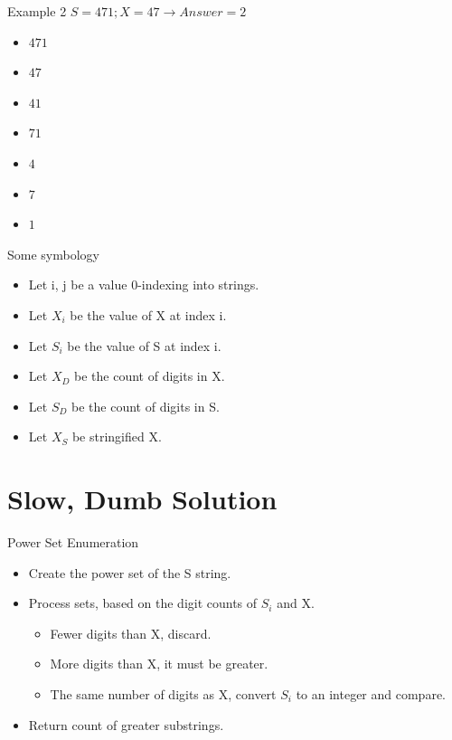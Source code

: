 \documentclass[10pt]{beamer}
\begin{document}
\begin{frame}{Example 2}
  \Large
  $S = 471; X = 47 \rightarrow Answer = 2$ \\
  \begin{itemize}[<+->]
    \item $471 $   
    \item $47  $    
    \item $41  $ 
    \item $71  $    
    \item $4   $ \only<8->{$\le 47$}
    \item $7   $ 
    \item $1   $ 
  \end{itemize}
\end{frame}

\begin{frame}{Some symbology}
  \Large
  \begin{itemize} %
    \item Let i, j be a value 0-indexing into strings.
    \item Let $X_{i}$ be the value of X at index i.
    \item Let $S_{i}$ be the value of S at index i.
    \item Let $X_{D}$ be the count of digits in X.
    \item Let $S_{D}$ be the count of digits in S.
    \item Let $X_{S}$ be stringified X.
  \end{itemize}
\end{frame}

\section{Slow, Dumb Solution}

\begin{frame}{Power Set Enumeration}
  \Large
  \begin{itemize} %
    \item Create the power set of the S string.
    \item Process sets, based on the digit counts of $S_i$ and X.
      \begin{itemize}
        \large
        \item Fewer digits than X, discard.
        \item More digits than X, it must be greater.
        \item The same number of digits as X, convert $S_i$ to an integer and compare.
      \end{itemize}
    \item Return count of greater substrings.
  \end{itemize}
\end{frame}
\end{document}
